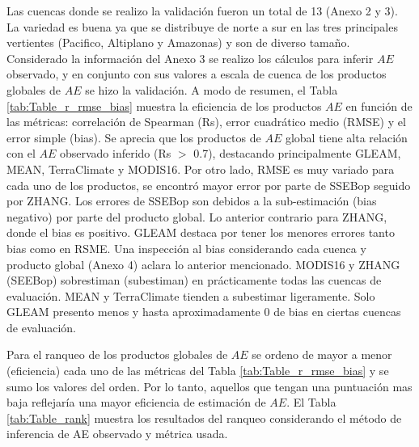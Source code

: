 \documentclass[12pt]{article}
\begin{document}
Las cuencas donde se realizo la validación fueron un total de 13 (Anexo 2 y 3). La variedad es buena ya que se distribuye de norte a sur en las tres principales vertientes (Pacifico, Altiplano y Amazonas) y son de diverso tamaño. Considerado la información del Anexo 3 se realizo los cálculos para inferir $AE$ observado, y en conjunto con sus valores a escala de cuenca de los productos globales de $AE$ se hizo la validación. A modo de resumen, el Tabla \ref{tab:Table_r_rmse_bias} muestra la eficiencia de los productos $AE$ en función de las métricas: correlación de Spearman (Rs), error cuadrático medio (RMSE) y el error simple (bias). Se aprecia que los productos de $AE$ global tiene alta relación con el $AE$ observado inferido (Rs $>$ 0.7), destacando principalmente GLEAM, MEAN, TerraClimate y MODIS16. Por otro lado, RMSE es muy variado para cada uno de los productos, se encontró mayor error por parte de SSEBop seguido por ZHANG. Los errores de SSEBop son debidos a la sub-estimación (bias negativo) por parte del producto global. Lo anterior contrario para ZHANG, donde el bias es positivo. GLEAM destaca por tener los menores errores tanto bias como en RSME. Una inspección al bias considerando cada cuenca y producto global (Anexo 4) aclara lo anterior mencionado. MODIS16 y ZHANG (SEEBop) sobrestiman (subestiman) en prácticamente todas las cuencas de evaluación. MEAN y TerraClimate tienden a subestimar ligeramente. Solo GLEAM presento menos y hasta aproximadamente 0 de bias en ciertas cuencas de evaluación.



Para el ranqueo de los productos globales de $AE$ se ordeno de mayor a menor (eficiencia) cada uno de las métricas del Tabla \ref{tab:Table_r_rmse_bias} y se sumo los valores del orden. Por lo tanto, aquellos que tengan una puntuación mas baja reflejaría una mayor eficiencia de estimación de $AE$. El Tabla \ref{tab:Table_rank} muestra los resultados del ranqueo considerando el método de inferencia de AE observado y métrica usada. 


\end{document}
